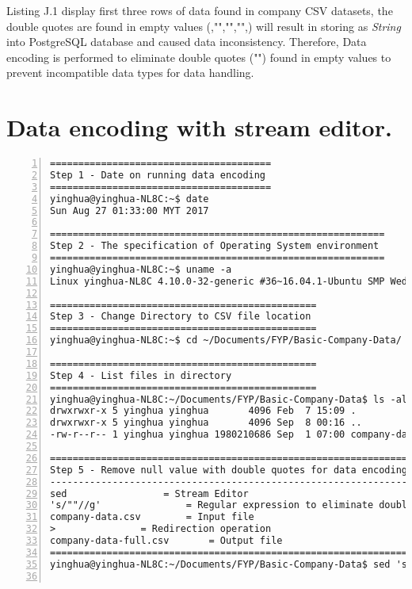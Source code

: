Listing J.1 display first three rows of data found in company CSV datasets, the double quotes are found in empty values (,"","","",) will result in storing as \textit{String} into PostgreSQL database and caused data inconsistency. Therefore, Data encoding is performed to eliminate double quotes ("") found in empty values to prevent incompatible data types for data handling.

\newpage

\section {Data encoding with stream editor.}

\lstset{basicstyle=\ttfamily\tiny}  
\begin{lstlisting}[breaklines, frame=single, numbers=left, caption={Execution of data encoding with stream editor.}, label=commandline-02]
=======================================
Step 1 - Date on running data encoding
=======================================
yinghua@yinghua-NL8C:~$ date
Sun Aug 27 01:33:00 MYT 2017

===========================================================
Step 2 - The specification of Operating System environment
===========================================================
yinghua@yinghua-NL8C:~$ uname -a 
Linux yinghua-NL8C 4.10.0-32-generic #36~16.04.1-Ubuntu SMP Wed Aug 9 09:19:02 UTC 2017 x86_64 x86_64 x86_64 GNU/Linux

===============================================
Step 3 - Change Directory to CSV file location
===============================================
yinghua@yinghua-NL8C:~$ cd ~/Documents/FYP/Basic-Company-Data/

===============================================
Step 4 - List files in directory
===============================================
yinghua@yinghua-NL8C:~/Documents/FYP/Basic-Company-Data$ ls -al 
drwxrwxr-x 5 yinghua yinghua       4096 Feb  7 15:09 .
drwxrwxr-x 5 yinghua yinghua       4096 Sep  8 00:16 ..
-rw-r--r-- 1 yinghua yinghua 1980210686 Sep  1 07:00 company-data.csv <-- Input file for encoding

===========================================================================
Step 5 - Remove null value with double quotes for data encoding
---------------------------------------------------------------------------
sed 				= Stream Editor 
's/""//g'   			= Regular expression to eliminate double quotes in empty field
company-data.csv 		= Input file 
> 				= Redirection operation 
company-data-full.csv 		= Output file
===========================================================================
yinghua@yinghua-NL8C:~/Documents/FYP/Basic-Company-Data$ sed 's/""//g' company-data.csv > company-data-full.csv


\end{lstlisting}
